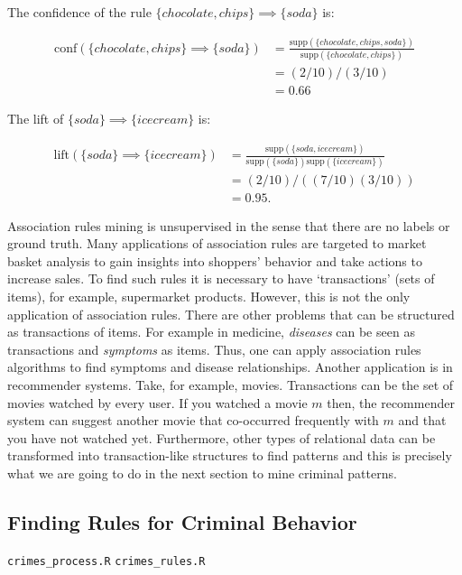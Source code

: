 \documentclass[
  11pt,
]{krantz}
\makeatletter
\newenvironment{kframe}{%
\medskip{}
\setlength{\fboxsep}{.8em}
 \def\at@end@of@kframe{}%
 \ifinner\ifhmode%
  \def\at@end@of@kframe{\end{minipage}}%
  \begin{minipage}{\columnwidth}%
 \fi\fi%
 \def\FrameCommand##1{\hskip\@totalleftmargin \hskip-\fboxsep
 \colorbox{shadecolor}{##1}\hskip-\fboxsep
     \hskip-\linewidth \hskip-\@totalleftmargin \hskip\columnwidth}%
 \MakeFramed {\advance\hsize-\width
   \@totalleftmargin\z@ \linewidth\hsize
   \@setminipage}}%
 {\par\unskip\endMakeFramed%
 \at@end@of@kframe}
\newenvironment{rmdblock}[1]
  {
  \begin{itemize}
  \renewcommand{\labelitemi}{
    \raisebox{-.7\height}[0pt][0pt]{
      {\setkeys{Gin}{width=3em,keepaspectratio}\texttt{[image: images/icons/\#1]}}
    }
  }
  \setlength{\fboxsep}{1em}
  \begin{kframe}
  \item
  }
  {
  \end{kframe}
  \end{itemize}
  }
\newenvironment{rmdfolder}
  {\begin{rmdblock}{folder}}
  {\end{rmdblock}}
\makeatother
\begin{document}
The confidence of the rule \(\{chocolate, chips\} \implies \{soda\}\) is:

\begin{align*}
\text{conf}(\{chocolate, chips\} \implies \{soda\})&=\frac{\text{supp}(\{chocolate, chips, soda\})}{\text{supp}(\{chocolate,chips\})} \\
&=(2/10) / (3/10) \\
&=0.66
\end{align*}

The lift of \(\{soda\} \implies \{ice cream\}\) is:

\begin{align*}
\text{lift}(\{soda\} \implies \{ice cream\})&=\frac{\text{supp}(\{soda, ice cream\})}{\text{supp}(\{soda\})\text{supp}(\{ice cream\})} \\
&=(2/10) / ((7/10)(3/10)) \\
&=0.95.
\end{align*}

Association rules mining is unsupervised in the sense that there are no labels or ground truth. Many applications of association rules are targeted to market basket analysis to gain insights into shoppers' behavior and take actions to increase sales. To find such rules it is necessary to have `transactions' (sets of items), for example, supermarket products. However, this is not the only application of association rules. There are other problems that can be structured as transactions of items. For example in medicine, \emph{diseases} can be seen as transactions and \emph{symptoms} as items. Thus, one can apply association rules algorithms to find symptoms and disease relationships. Another application is in recommender systems. Take, for example, movies. Transactions can be the set of movies watched by every user. If you watched a movie \(m\) then, the recommender system can suggest another movie that co-occurred frequently with \(m\) and that you have not watched yet. Furthermore, other types of relational data can be transformed into transaction-like structures to find patterns and this is precisely what we are going to do in the next section to mine criminal patterns.

\hypertarget{finding-rules-for-criminal-behavior}{%
\subsection{Finding Rules for Criminal Behavior}\label{finding-rules-for-criminal-behavior}}

\begin{rmdfolder}
\texttt{crimes\_process.R} \texttt{crimes\_rules.R}
\end{rmdfolder}
\end{document}
